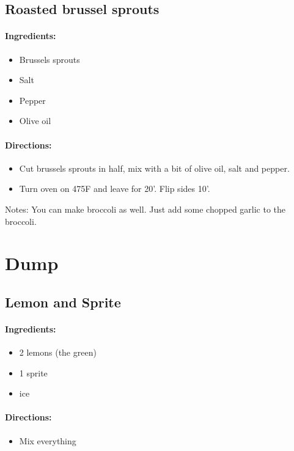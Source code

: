 \documentclass{article}
\begin{document}
\subsection{Roasted brussel sprouts}

\paragraph{Ingredients:}

\begin{itemize}
	\item Brussels sprouts
	\item Salt
	\item Pepper
	\item Olive oil
\end{itemize}

\paragraph{Directions:}
\begin{itemize}
	\item Cut brussels sprouts in half, mix with a bit of olive oil, salt and pepper.
	\item Turn oven on 475F and leave for 20'. Flip sides 10'.
\end{itemize}

Notes: You can make broccoli as well. Just add some chopped garlic to the broccoli.

\section{Dump}

\subsection{Lemon and Sprite}

\paragraph{Ingredients:}

\begin{itemize}
	\item 2 lemons (the green)
	\item 1 sprite
	\item ice
\end{itemize}

\paragraph{Directions:}
\begin{itemize}
	\item Mix everything
\end{itemize}
\end{document}
